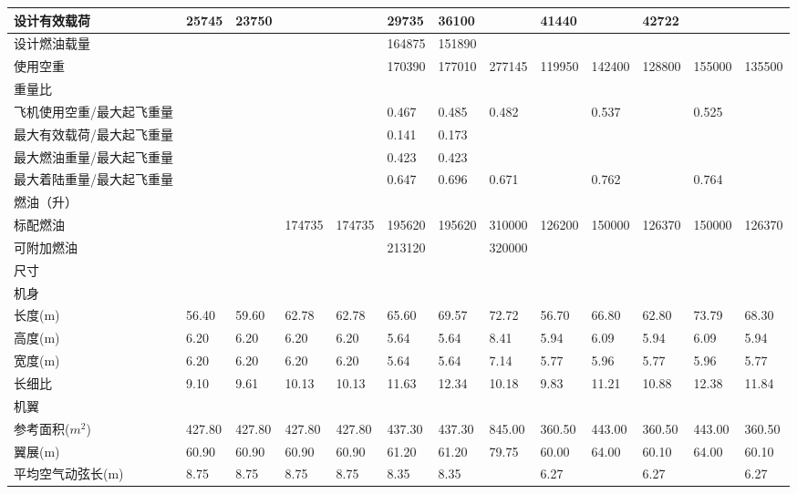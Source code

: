 \documentclass[12pt,a4paper]{report}
\begin{document}
\begin{landscape}
\begin{center}
\begin{longtable}{|p{1.5cm}|p{1.3cm}|p{1.1cm}|p{1.1cm}|p{1.1cm}|p{1.1cm}|p{1.1cm}|p{1.1cm}|p{1.1cm}|p{1.1cm}|p{1.1cm}|p{1.1cm}|p{1.1cm}|}
设计有效载荷	&	25745	&	23750	&		&		&	29735	&	36100	&		&	41440	&		&	42722	&		&		\\ \hline
设计燃油载量	&		&		&		&		&	164875	&	151890	&		&		&		&		&		&		\\ \hline
使用空重	&		&		&		&		&	170390	&	177010	&	277145	&	119950	&	142400	&	128800	&	155000	&	135500	\\ \hline
重量比	&		&		&		&		&		&		&		&		&		&		&		&		\\ \hline
飞机使用空重/最大起飞重量	&		&		&		&		&	0.467	&	0.485	&	0.482	&		&	0.537	&		&	0.525	&		\\ \hline
最大有效载荷/最大起飞重量	&		&		&		&		&	0.141	&	0.173	&		&		&		&		&		&		\\ \hline
最大燃油重量/最大起飞重量	&		&		&		&		&	0.423	&	0.423	&		&		&		&		&		&		\\ \hline
最大着陆重量/最大起飞重量	&		&		&		&		&	0.647	&	0.696	&	0.671	&		&	0.762	&		&	0.764	&		\\ \hline
燃油（升）	&		&		&		&		&		&		&		&		&		&		&		&		\\ \hline
标配燃油	&		&		&	174735	&	174735	&	195620	&	195620	&	310000	&	126200	&	150000	&	126370	&	150000	&	126370	\\ \hline
可附加燃油	&		&		&		&		&	213120	&		&	320000	&		&		&		&		&		\\ \hline
尺寸	&		&		&		&		&		&		&		&		&		&		&		&		\\ \hline
机身	&		&		&		&		&		&		&		&		&		&		&		&		\\ \hline
长度(m)	&	56.40	&	59.60	&	62.78	&	62.78	&	65.60	&	69.57	&	72.72	&	56.70	&	66.80	&	62.80	&	73.79	&	68.30	\\ \hline
高度(m)	&	6.20	&	6.20	&	6.20	&	6.20	&	5.64	&	5.64	&	8.41	&	5.94	&	6.09	&	5.94	&	6.09	&	5.94	\\ \hline
宽度(m)	&	6.20	&	6.20	&	6.20	&	6.20	&	5.64	&	5.64	&	7.14	&	5.77	&	5.96	&	5.77	&	5.96	&	5.77	\\ \hline
长细比	&	9.10	&	9.61	&	10.13	&	10.13	&	11.63	&	12.34	&	10.18	&	9.83	&	11.21	&	10.88	&	12.38	&	11.84	\\ \hline
机翼	&		&		&		&		&		&		&		&		&		&		&		&		\\ \hline
参考面积($m^2$)	&	427.80	&	427.80	&	427.80	&	427.80	&	437.30	&	437.30	&	845.00	&	360.50	&	443.00	&	360.50	&	443.00	&	360.50	\\ \hline
翼展(m)	&	60.90	&	60.90	&	60.90	&	60.90	&	61.20	&	61.20	&	79.75	&	60.00	&	64.00	&	60.10	&	64.00	&	60.10	\\ \hline
平均空气动弦长(m)	&	8.75	&	8.75	&	8.75	&	8.75	&	8.35	&	8.35	&		&	6.27	&		&	6.27	&		&	6.27	\\ \hline

\end{longtable}
\end{center}
\end{landscape}
\end{document}
